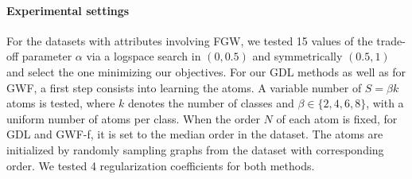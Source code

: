 \documentclass{article}
\begin{document}
	\begin{table*}[t!]
		\caption{Clustering: Rand Index computed for benchmarked approaches on real datasets.}
		\label{tab:clustering}
		\begin{center}
		\end{center}
	\end{table*}
	
	\paragraph{Experimental settings} For the datasets with attributes involving FGW, we tested 15 values of the trade-off parameter $\alpha$ via a logspace search in $(0,0.5)$ and symmetrically
	$(0.5,1)$ and select the one minimizing our objectives.
	For our GDL methods as well as for GWF, a first step consists into learning the atoms.
	A variable number of $S=\beta k$ atoms is tested, where $k$ denotes the number of classes and $\beta \in \{2,4,6,8\}$, with a uniform number of atoms per class. 
	When the order $N$ of each atom is fixed, for GDL and GWF-f, it is set to the
	median order in the dataset. The atoms are initialized by randomly sampling graphs from
	the dataset with corresponding order. We tested 4 regularization coefficients for both methods.
	
\end{document}
